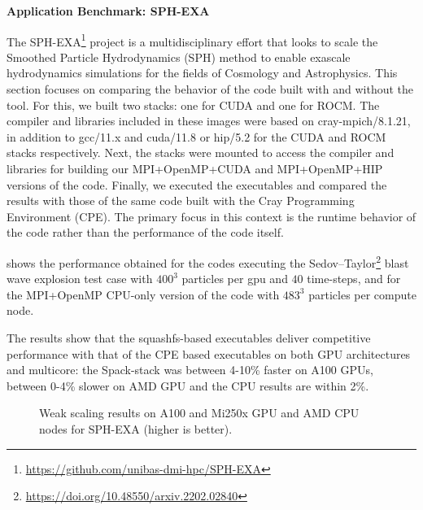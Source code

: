 \vfill\eject


\noindent\textbf{Application Benchmark: SPH-EXA}

The SPH-EXA\footnote{\url{https://github.com/unibas-dmi-hpc/SPH-EXA}} project is a multidisciplinary effort that looks to scale the Smoothed Particle Hydrodynamics (SPH) method to enable exascale hydrodynamics simulations for the fields of Cosmology and Astrophysics. 
This section focuses on comparing the behavior of the code built with and without the \stackinator tool.
For this, we built two \stackinator stacks: one for CUDA and one for ROCM.
The compiler and libraries included in these images were based on cray-mpich/8.1.21, in addition to gcc/11.x and cuda/11.8 or hip/5.2 for the CUDA and ROCM stacks respectively.
Next, the stacks were mounted to access the compiler and libraries for building our MPI+OpenMP+CUDA and MPI+OpenMP+HIP versions of the code.
Finally, we executed the executables and compared the results with those of the same code built with the Cray Programming Environment (CPE).
The primary focus in this context is the runtime behavior of the code rather than the performance of the code itself.

 shows the performance obtained for the codes executing the Sedov--Taylor\footnote{\url{https://doi.org/10.48550/arxiv.2202.02840}} blast wave explosion test case with $400^3$ particles per gpu and $40$ time-steps, and for the MPI+OpenMP CPU-only version of the code with $483^3$ particles per compute node.

The results show that the squashfs-based executables deliver competitive performance with that of the CPE based executables on both GPU architectures and multicore: the Spack-stack was between 4-10\% faster on A100 GPUs, between 0-4\% slower on AMD GPU and the CPU results are within 2\%.

\begin{figure}[htp!]
    \begin{center}
        
        
        
    \end{center}
    \caption{Weak scaling results on A100 and Mi250x GPU and AMD CPU nodes for SPH-EXA (higher is better).}
    \label{fig:sph-weak}
\end{figure}

